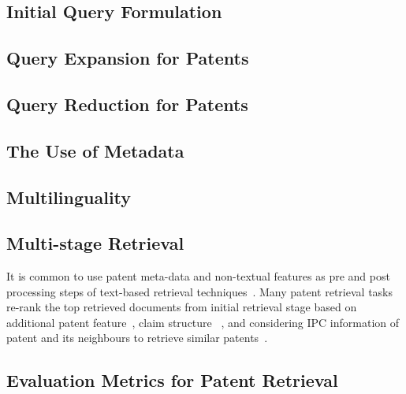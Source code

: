 \subsection{Initial Query Formulation}


\subsection{Query Expansion for Patents}


\subsection{Query Reduction for Patents}


%

\subsection{The Use of Metadata}

\label{sec:metadata}

\subsection{Multilinguality}


\subsection{Multi-stage Retrieval}
It is common to use patent meta-data and non-textual features as pre and post processing steps of text-based retrieval techniques~\citep{lopez2009multiple}. Many patent retrieval tasks re-rank the top retrieved documents from initial retrieval stage based on additional patent feature~\citep{lopez2010experiments}, claim structure ~\citep{mase2005proposal}, and considering IPC information of patent and its neighbours to retrieve similar patents~\citep{verma2011exploring}. 

\subsection{Evaluation Metrics for Patent Retrieval}



